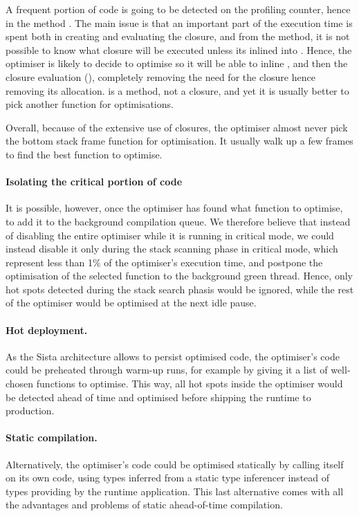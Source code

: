 \documentclass[a4paper,12pt,twoside]{../includes/ThesisStyle}
\begin{document}
A frequent portion of code is going to be detected on the profiling counter, hence in the method . The main issue is that an important part of the execution time is spent both in creating and evaluating the closure, and from the  method, it is not possible to know what closure will be executed unless its inlined into . Hence, the optimiser is likely to decide to optimise  so it will be able to inline , and then the closure evaluation (), completely removing the need for the closure hence removing its allocation.  is a method, not a closure, and yet it is usually better to pick another function for optimisations.

Overall, because of the extensive use of closures, the optimiser almost never pick the bottom stack frame function for optimisation. It usually walk up a few frames to find the best function to optimise. 

\paragraph{Isolating the critical portion of code}
It is possible, however, once the optimiser has found what function to optimise, to add it to the background compilation queue. We therefore believe that instead of disabling the entire optimiser while it is running in critical mode, we could instead disable it only during the stack scanning phase in critical mode, which represent less than 1\% of the optimiser's execution time, and postpone the optimisation of the selected function to the background green thread. Hence, only hot spots detected during the stack search phasis would be ignored, while the rest of the optimiser would be optimised at the next idle pause.

\paragraph{Hot deployment.} As the Sista architecture allows to persist optimised code, the optimiser's code could be preheated through warm-up runs, for example by giving it a list of well-chosen functions to optimise. This way, all hot spots inside the optimiser would be detected ahead of time and optimised before shipping the runtime to production. 

\paragraph{Static compilation.} Alternatively, the optimiser's code could be optimised statically by calling itself on its own code, using types inferred from a static type inferencer instead of types providing by the runtime application. This last alternative comes with all the advantages and problems of static ahead-of-time compilation.
\end{document}
